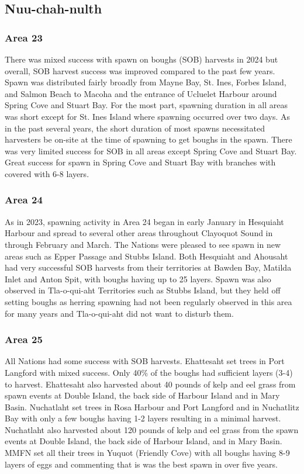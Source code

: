 \subsection{Nuu-chah-nulth}

\subsubsection{Area 23}

There was mixed success with spawn on boughs (SOB) harvests in 2024
but overall, SOB harvest success was improved compared to the past few years.
Spawn was distributed fairly broadly from Mayne Bay, St. Ines, Forbes Island,
and Salmon Beach to Macoha and the entrance of Ucluelet Harbour
around Spring Cove and Stuart Bay.
For the most part, spawning duration in all areas was short
except for St. Ines Island where spawning occurred over two days.
As in the past several years, the short duration of most spawns
necessitated harvesters be on-site at the time of spawning
to get boughs in the spawn.
There was very limited success for SOB in all areas
except Spring Cove and Stuart Bay.
Great success for spawn in Spring Cove and Stuart Bay
with branches with covered with 6-8 layers. 

\subsubsection{Area 24}

As in 2023, spawning activity in Area 24 began in
early January in Hesquiaht Harbour and spread to several other areas
throughout Clayoquot Sound in through February and March.
The Nations were pleased to see spawn in new areas such as
Epper Passage and Stubbs Island.
Both Hesquiaht and Ahousaht had very successful SOB harvests
from their territories at Bawden Bay, Matilda Inlet and Anton Spit,
with boughs having up to 25 layers.
Spawn was also observed in Tla-o-qui-aht Territories such as Stubbs Island,
but they held off setting boughs as herring spawning
had not been regularly observed in this area for many years and
Tla-o-qui-aht did not want to disturb them.  

\subsubsection{Area 25}

All Nations had some success with SOB harvests.
Ehattesaht set trees in Port Langford with mixed success.
Only 40\% of the boughs had sufficient layers (3-4) to harvest.
Ehattesaht also harvested about 40 pounds of kelp and eel grass
from spawn events at Double Island, the back side of Harbour Island
and in Mary Basin.
Nuchatlaht set trees in Rosa Harbour and Port Langford and
in Nuchatlitz Bay with only a few boughs having 1-2 layers
resulting in a minimal harvest.
Nuchatlaht also harvested about 120 pounds of kelp and eel grass from
the spawn events at Double Island, the back side of Harbour Island, and
in Mary Basin.
MMFN set all their trees in Yuquot (Friendly Cove)
with all boughs having 8-9 layers of eggs and
commenting that is was the best spawn in over five years.
